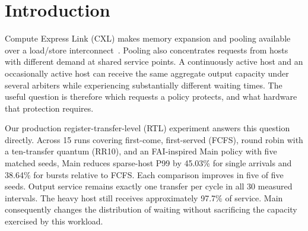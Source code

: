 \begin{abstract}
Arbitration determines who waits even when a shared output runs at full capacity.
We connect this service trade-off to hardware cost in a common register-transfer-level
(RTL) framework for Compute Express Link (CXL) switch arbitration. Fifteen production
RTL runs pass across five matched seeds. After two natural classification windows,
the FAI-inspired Main policy lowers sparse-host generation-to-fire P99 by 45.03\%
relative to first-come, first-served (FCFS) for single arrivals and by 38.64\% for
eight-request bursts, improving in all five seeds of both profiles. Relative to
round robin with a ten-transfer quantum (RR10), Main improves P99 by 9.09\% for
single arrivals and increases it by 20.78\% for bursts. Every measured interval
sustains 1.000000 transfer/cycle, with the heavy host retaining approximately
97.7\% of service. All nine primary mappings close at 25\,ns. Main adds
4.97--5.89\% total area over FCFS and 38.22--39.27\% over RR10;
first-in, first-out (FIFO) subtrees
account for 92.40--98.63\% of area. Independent auditing and RTL/netlist
equivalence connect these results to the implemented designs. The central result
is a quantified exchange: classification protects sparse-host latency at modest
incremental area over FCFS, while per-source rotation offers better burst-tail
behavior than class aggregation in the tested workload.
\end{abstract}

\section{Introduction}
Compute Express Link (CXL) makes memory expansion and pooling available over a
load/store interconnect~\cite{cxl_intro}. Pooling also concentrates requests from
hosts with different demand at shared service points. A continuously active host
and an occasionally active host can receive the same aggregate output capacity
under several arbiters while experiencing substantially different waiting times.
The useful question is therefore which requests a policy protects, and what
hardware that protection requires.

Our production register-transfer-level (RTL) experiment answers this question
directly. Across 15 runs covering first-come, first-served (FCFS), round robin
with a ten-transfer quantum (RR10), and an FAI-inspired Main policy with five matched seeds,
Main reduces sparse-host P99 by 45.03\% for single arrivals and 38.64\% for bursts
relative to FCFS. Each comparison improves in five of five seeds. Output service
remains exactly one transfer per cycle in all 30 measured intervals. The heavy
host still receives approximately 97.7\% of service. Main consequently changes
the distribution of waiting without sacrificing the capacity exercised by this
workload.


